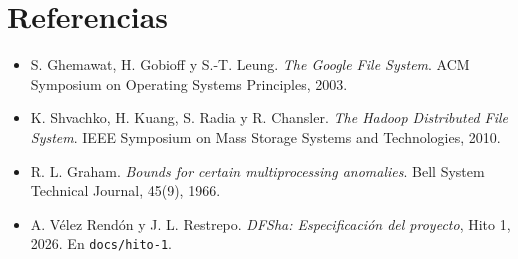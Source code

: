 \documentclass[10pt]{article}
\begin{document}
\separador

\section{Referencias}

\begin{itemize}
\item S. Ghemawat, H. Gobioff y S.-T. Leung. \emph{The Google File System}. ACM Symposium on Operating Systems Principles, 2003.
\item K. Shvachko, H. Kuang, S. Radia y R. Chansler. \emph{The Hadoop Distributed File System}. IEEE Symposium on Mass Storage Systems and Technologies, 2010.
\item R. L. Graham. \emph{Bounds for certain multiprocessing anomalies}. Bell System Technical Journal, 45(9), 1966.
\item A. Vélez Rendón y J. L. Restrepo. \emph{DFSha: Especificación del proyecto}, Hito 1, 2026. En \texttt{docs/hito-1}.
\end{itemize}
\end{document}

